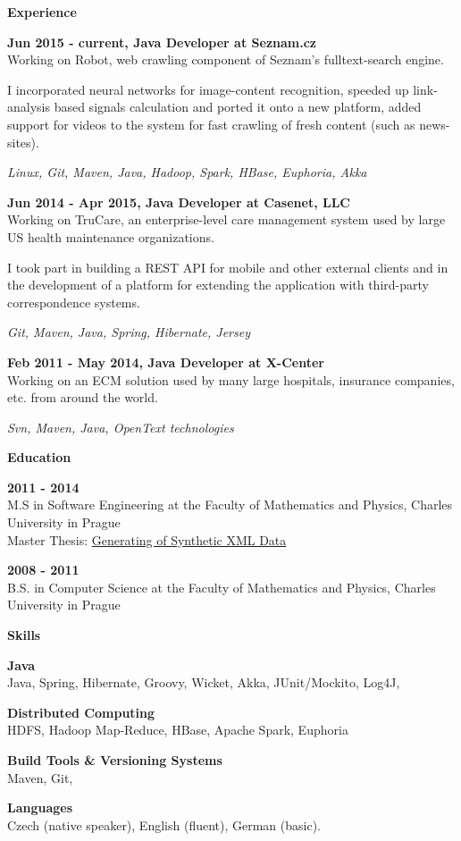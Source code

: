 \documentclass[a4paper,11pt,final]{memoir}
\newcommand{\Sep}{\vspace{1.4em}}
\newcommand{\SmallSep}{\vspace{0.5em}}
\newcommand{\CVSection}[1]
	{\Large\textbf{#1}\par
	\SmallSep\normalsize\normalfont}
\newcommand{\CVItem}[1]
	{\textbf{\color{RoyalBlue} #1}}
\begin{document}
\CVSection{Experience}

\CVItem{Jun 2015 - current, Java Developer at Seznam.cz}\\
Working on Robot, web crawling component of Seznam's fulltext-search engine.

I incorporated neural networks for image-content recognition, speeded
up link-analysis based signals calculation and ported it onto a new
platform, added support for videos to the system for fast crawling
of fresh content (such as news-sites).

\vspace{0.2em}
\textit{Linux, Git, Maven, Java, Hadoop, Spark, HBase, Euphoria, Akka}
\SmallSep

\CVItem{Jun 2014 - Apr 2015, Java Developer at Casenet, LLC}\\
Working on TruCare, an enterprise-level care management system used
by large US health maintenance organizations.

I took part in building a REST API for mobile and other external clients
and in the development of a platform for extending the application with
third-party correspondence systems.

\vspace{0.2em}
\textit{Git, Maven, Java, Spring, Hibernate, Jersey}
\SmallSep

\CVItem{Feb 2011 - May 2014, Java Developer at X-Center}\\
Working on an ECM solution used by many large hospitals, insurance companies, etc. from around the world.

\vspace{0.2em}
\textit{Svn, Maven, Java, OpenText technologies}
\Sep

\CVSection{Education}
\CVItem{2011 - 2014}\\
M.S in Software Engineering at the Faculty of Mathematics and Physics, Charles University in Prague\\
\SmallSep
Master Thesis: \href{http://www.dusanrychnovsky.cz/files/master-thesis.pdf}{Generating of Synthetic XML Data}
\SmallSep

\CVItem{2008 - 2011}\\
B.S. in Computer Science at the Faculty of Mathematics and Physics, Charles University in Prague
\Sep

\CVSection{Skills}

\CVItem{Java}\\
Java, Spring, Hibernate, Groovy, Wicket, Akka, JUnit/Mockito, Log4J,
\SmallSep

\CVItem{Distributed Computing}\\
HDFS, Hadoop Map-Reduce, HBase, Apache Spark, Euphoria
\SmallSep

\CVItem{Build Tools \& Versioning Systems}\\
Maven, Git,
\SmallSep 

\CVItem{Languages}\\
Czech (native speaker), English (fluent), German (basic).
\Sep 

\end{document}
